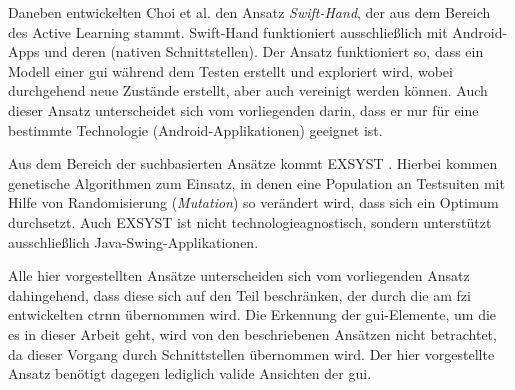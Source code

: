 Daneben entwickelten Choi et al. \cite{choiGuidedGUITesting2013} den Ansatz \emph{Swift-Hand}, der aus dem Bereich des Active Learning stammt. Swift-Hand funktioniert ausschließlich mit Android-Apps und deren (nativen Schnittstellen). Der Ansatz funktioniert so, dass ein Modell einer \gls{gui} während dem Testen erstellt und exploriert wird, wobei durchgehend neue Zustände erstellt, aber auch vereinigt werden können. Auch dieser Ansatz unterscheidet sich vom vorliegenden darin, dass er nur für eine bestimmte Technologie (Android-Applikationen) geeignet ist.

Aus dem Bereich der suchbasierten Ansätze kommt EXSYST \cite{grossSearchbasedSystemTesting2012}. Hierbei kommen genetische Algorithmen zum Einsatz, in denen eine Population an Testsuiten mit Hilfe von Randomisierung (\emph{Mutation}) so verändert wird, dass sich ein Optimum durchsetzt. Auch EXSYST ist nicht technologieagnostisch, sondern unterstützt ausschließlich Java-Swing-Applikationen.

Alle hier vorgestellten Ansätze unterscheiden sich vom vorliegenden Ansatz dahingehend, dass diese sich auf den Teil beschränken, der durch die am \gls{fzi} entwickelten \gls{ctrnn} übernommen wird. Die Erkennung der \gls{gui}-Elemente, um die es in dieser Arbeit geht, wird von den beschriebenen Ansätzen nicht betrachtet, da dieser Vorgang durch Schnittstellen übernommen wird. Der hier vorgestellte Ansatz benötigt dagegen lediglich valide Ansichten der \gls{gui}.


